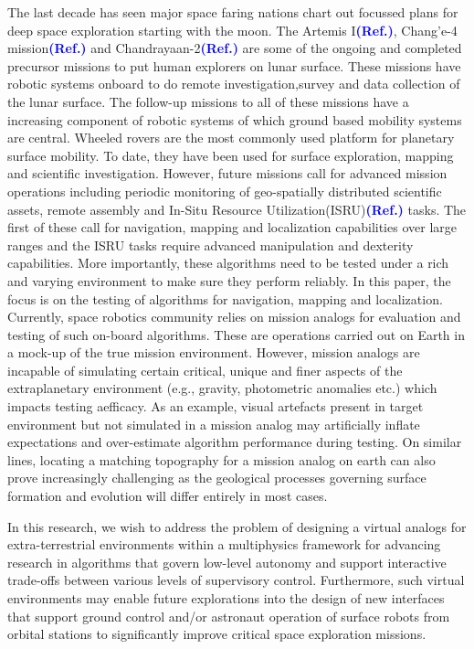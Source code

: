 \documentclass[a4paper, 10pt, conference]{ieeeconf}      %
\newcommand\coltxt[2]{\textbf{\textcolor{#1}{(#2)}}}
\newcommand\msm[1]{\coltxt{blue}{#1}}
\begin{document}
The last decade has seen major space faring nations chart out focussed plans for deep space exploration starting with the moon. The Artemis I\msm{Ref.},  Chang'e-4 mission\msm{Ref.} and Chandrayaan-2\msm{Ref.} are some of the ongoing and completed precursor missions to put human explorers on lunar surface. These missions have robotic systems onboard to do remote investigation,survey and data collection of the lunar surface. The follow-up missions to all of these missions have a increasing component of robotic systems of which ground based mobility systems are central. Wheeled rovers are the most commonly used platform for planetary surface mobility. To date, they have been used for surface exploration, mapping and scientific investigation. However, future missions call for advanced mission operations including periodic monitoring of geo-spatially distributed scientific assets, remote assembly and In-Situ Resource Utilization(ISRU)\msm{Ref.}  tasks. The first of these call for navigation, mapping and localization capabilities over large ranges and the ISRU tasks require advanced manipulation and dexterity capabilities. More importantly, these algorithms need to be tested under a rich and varying environment to make sure they perform reliably. In this paper, the focus is on the testing of algorithms for navigation, mapping and localization. Currently, space robotics community relies on mission analogs for evaluation and testing of such on-board algorithms. These are operations carried out on Earth in a mock-up of the true mission environment. However, mission analogs are incapable of simulating certain critical, unique and finer aspects of the extraplanetary environment (e.g., gravity, photometric anomalies etc.) which impacts testing aefficacy. As an example, visual artefacts present in target environment but not simulated in a mission analog may artificially inflate expectations and over-estimate algorithm performance during testing. On similar lines, locating a matching topography for a mission analog on earth can also prove increasingly challenging as the geological processes governing surface formation and evolution will differ entirely in most cases.    

In this research, we wish to address the problem of designing a virtual analogs for extra-terrestrial environments within a multiphysics framework for advancing research in algorithms that govern low-level autonomy and support interactive trade-offs between various levels of supervisory control. Furthermore, such virtual environments may enable future explorations into the design of new interfaces that support ground control and/or astronaut operation of surface robots from orbital stations to significantly improve critical space exploration missions. 
\end{document}
